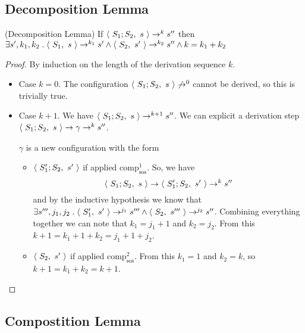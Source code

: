 \documentclass[12pt,a4paper,oneside]{book}
\begin{document}
\subsection{Decomposition Lemma}

\begin{theorem}{(Decomposition Lemma)}
    If $\langle\ S_1; S_2,\ s\ \rangle \to^k s''$ then $\exists s', k_1, k_2 \mathrel{.} \langle\ S_1,\ s\ \rangle \to^{k_1} s' \land \langle\ S_2,\ s'\ \rangle \to^{k_2} s'' \land k = k_1 + k_2$

    \begin{proof}
        By induction on the length of the derivation sequence $k$.

        \begin{itemize}
            \item Case $k=0$. The configuration $\langle\ S_1;S_2,\ s\ \rangle
              \not\to^0$ cannot be derived, so this is trivially true.

            \item Case $k+1$. We have $\langle\ S_1;S_2,\ s\ \rangle \to^{k+1}
              s''$. We can explicit a derivation step
              $\langle\ S_1;S_2,\ s\ \rangle \to \gamma \to^{k} s''$.

            $\gamma$ is a new configuration with the form
            \begin{itemize}
                \item $\langle\ S_1';S_2,\ s'\ \rangle$ if applied $\textrm{comp}^{1}_{\textrm{sos}}$. So, we have
                \[
                    \langle\ S_1;S_2,\ s\ \rangle \to \langle\ S_1';S_2,\ s'\ \rangle \to^{k} s''
                \]
                and by the inductive hypothesis we know that $\exists
                s''', j_1, j_2 \mathrel{.} \langle\ S_1',\ s'\ \rangle \to^{j_1} s'''
                \land \langle\ S_2,\ s'''\ \rangle \to^{j_2} s''$. Combining
                everything together we can note that $k_1 = j_1 + 1$
                and $k_2 = j_2$. From this $k + 1 = k_1 + 1 + k_2 =
                j_1 + 1 + j_2$.

                \item $\langle\ S_2,\ s'\ \rangle$ if applied $\textrm{comp}^{2}_{\textrm{sos}}$. From this $k_1 = 1$ and $k_2 = k$, so $k + 1 = k_1 + k_2 = k + 1$.
            \end{itemize}
        \end{itemize}
    \end{proof}
\end{theorem}

\subsection{Compostition Lemma}
\end{document}
